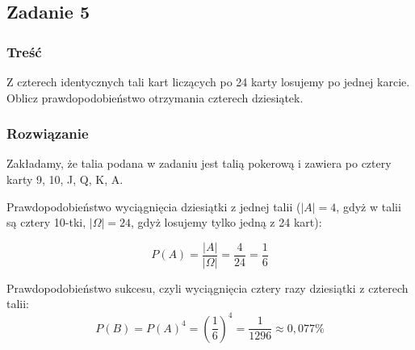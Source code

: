 \subsection{Zadanie 5}

\subsubsection*{Treść}
Z czterech identycznych tali kart liczących po 24 karty losujemy po jednej karcie. Oblicz prawdopodobieństwo otrzymania czterech dziesiątek.


\subsubsection*{Rozwiązanie}
Zakładamy, że talia podana w zadaniu jest talią pokerową i zawiera
po cztery karty 9, 10, J, Q, K, A.

Prawdopodobieństwo wyciągnięcia dziesiątki z jednej talii ($|A|=4$,
gdyż w talii są cztery 10-tki, $|\Omega|=24$, gdyż losujemy tylko jedną z 24 kart):

$$
P(A)=\frac{|A|}{|\Omega|}=\frac{4}{24}=\frac{1}{6}
$$

Prawdopodobieństwo sukcesu, czyli wyciągnięcia cztery razy dziesiątki
z czterech talii:
$$
P(B)=P(A)^4=(\frac{1}{6})^4=\frac{1}{1296}\approx0,077\%
$$

